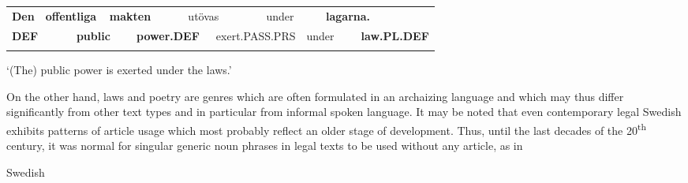 \begin{tabular}{llllllllllll}
\lsptoprule
{\bfseries Den} & \multicolumn{2}{l}{{\bfseries offentliga}

} & \multicolumn{2}{l}{{\bfseries makten}

} & \multicolumn{2}{l}{utövas

} & \multicolumn{2}{l}{under

} & \multicolumn{2}{l}{{\bfseries lagarna.}

} & \\
\multicolumn{2}{l}{{\bfseries DEF}

} & \multicolumn{2}{l}{{\bfseries public}

} & \multicolumn{2}{l}{{\bfseries power.DEF}

} & \multicolumn{2}{l}{exert.PASS.PRS

} & \multicolumn{2}{l}{under

} & \multicolumn{2}{l}{{\bfseries law.PL.DEF}

}\\
\lspbottomrule
\end{tabular}

\begin{styleTranslation}
 ‘(The) public power is exerted under the laws.’

\end{styleTranslation}

\begin{styleBodyTextFirst}
On the other hand, laws and poetry are genres which are often formulated in an archaizing language and which may thus differ significantly from other text types and in particular from informal spoken language. It may be noted that even contemporary legal Swedish exhibits patterns of article usage which most probably reflect an older stage of development. Thus, until the last decades of the 20\textsuperscript{th} century, it was normal for singular generic noun phrases in legal texts to be used without any article, as in 

\end{styleBodyTextFirst}

\begin{listWWNumileveli}
\item 

\begin{styleExample}
Swedish

\end{styleExample}

\end{listWWNumileveli}

